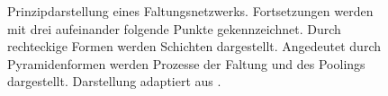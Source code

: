 \begin{figure}[H]
\begin{tikzpicture}
				
			\end{tikzpicture}
			\caption{Prinzipdarstellung eines Faltungsnetzwerks. Fortsetzungen werden mit drei aufeinander folgende Punkte gekennzeichnet. Durch rechteckige Formen werden Schichten dargestellt. Angedeutet durch Pyramidenformen werden Prozesse der Faltung und des Poolings dargestellt. Darstellung adaptiert aus \cite{carpng,todasc}.}
			\label{fig: depthwise conv }
		\end{figure}